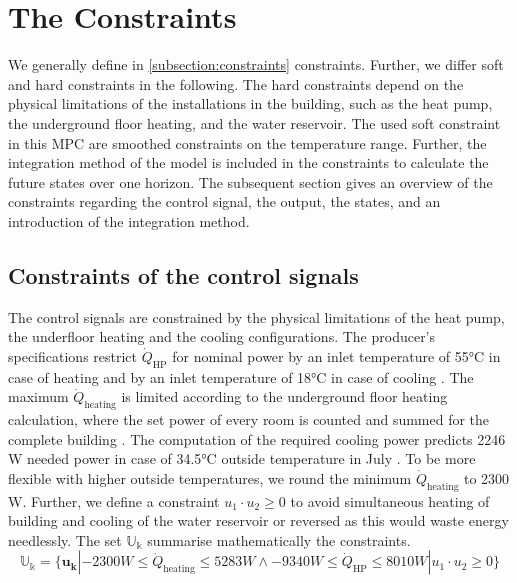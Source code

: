 \section{The Constraints}
\label{section:theconstraints}
We generally define in \autoref{subsection:constraints} constraints. Further, we differ soft and hard constraints in the following. The hard constraints depend on the physical limitations of the installations in the building, such as the heat pump, the underground floor heating, and the water reservoir. The used soft constraint in this MPC are smoothed constraints on the temperature range. Further, the integration method of the model is included in the constraints to calculate the future states over one horizon. The subsequent section gives an overview of the constraints regarding the control signal, the output, the states, and an introduction of the integration method.

\subsection{Constraints of the control signals}
\label{subsec:COnstraintU}
The control signals are constrained by the physical limitations of the heat pump, the underfloor heating and the cooling configurations.\newline
The producer's specifications restrict $\dot{Q}_\text{HP}$ for nominal power by an inlet temperature of 55°C in case of heating and by an inlet temperature of 18°C in case of cooling \cite{TUM}. The maximum $\dot{Q}_\text{heating}$ is limited according to the underground floor heating calculation, where the set power of every room is counted and summed for the complete building \cite{Roth_Auslegung.2020}. The computation of the required cooling power predicts 2246 W needed power in case of 34.5°C outside temperature in July \cite{SEFIngenieurgesellschaftMBH.2019}. To be more flexible with higher outside temperatures, we round the minimum $\dot{Q}_\text{heating}$ to 2300 W.\newline
Further, we define a constraint $u_1 \cdot u_2 \geq 0$ to avoid simultaneous heating of building and cooling of the water reservoir or reversed as this would waste energy needlessly.
The set $\mathbb{U_k}$ summarise mathematically the constraints.
\begin{equation}
    \label{ConstraintU}
    \mathbb{U_k} = \{\mathbf{u_k}| -2300 W \leq \dot{Q}_\text{heating} \leq 5283 W \wedge -9340 W \leq \dot{Q}_\text{HP} \leq 8010 W | u_1 \cdot u_2 \geq 0\} 
\end{equation}

